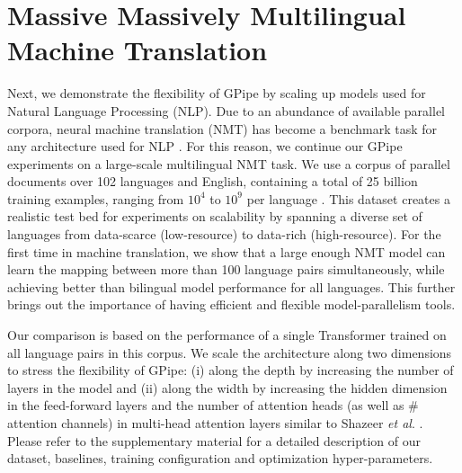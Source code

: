 \documentclass{article}
\def\codename{GPipe}
\def\onedot{.}
\def\etal{\emph{et al}\onedot}
\begin{document}
\section{Massive Massively Multilingual Machine Translation}
\label{sec:mt}
Next, we demonstrate the flexibility of \codename{} by scaling up models used for Natural Language Processing (NLP). Due to an abundance of available parallel corpora, neural machine translation (NMT) has become a benchmark task for any architecture used for NLP \cite{DBLP:journals/corr/GehringAGYD17,vaswani2017attention,shazeer2018mesh,theBestofBothWorlds18,DBLP:journals/corr/abs-1901-10430}. For this reason, we continue our \codename{} experiments on a large-scale multilingual NMT task. We use a corpus of parallel documents over 102 languages and English, containing a total of 25 billion training examples, ranging from $10^4$ to $10^9$ per language \cite{arivazhagan2019massively}. This dataset creates a realistic test bed for experiments on scalability by spanning a diverse set of languages from data-scarce (low-resource) to data-rich (high-resource). For the first time in machine translation, we show that a large enough NMT model can learn the mapping between more than 100 language pairs simultaneously, while achieving better than bilingual model performance for all languages. This further brings out the importance of having efficient and flexible model-parallelism tools.

Our comparison is based on the performance of a single Transformer \cite{vaswani2017attention} trained on all language pairs in this corpus. We scale the architecture along two dimensions to stress the flexibility of \codename{}: (i) along the depth by increasing the number of layers in the model and (ii) along the width by increasing the hidden dimension in the feed-forward layers and the number of attention heads (as well as \# attention channels) in multi-head attention layers similar to Shazeer \etal{} \cite{shazeer2018mesh}. Please refer to the supplementary material for a detailed description of our dataset, baselines, training configuration and optimization hyper-parameters.

\end{document}

